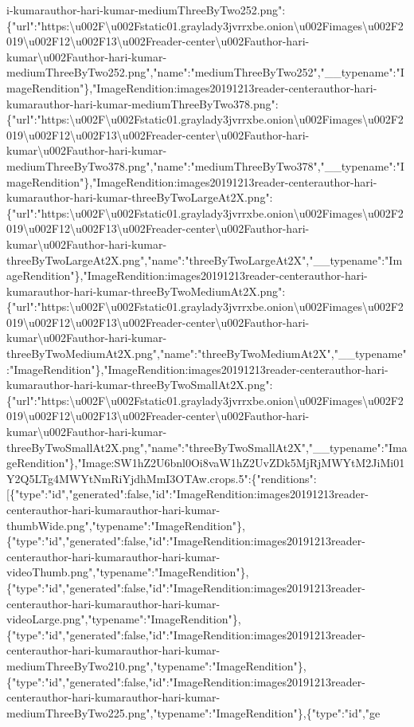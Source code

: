 i-kumarauthor-hari-kumar-mediumThreeByTwo252.png":\{"url":"https:\textbackslash{}u002F\textbackslash{}u002Fstatic01.graylady3jvrrxbe.onion\textbackslash{}u002Fimages\textbackslash{}u002F2019\textbackslash{}u002F12\textbackslash{}u002F13\textbackslash{}u002Freader-center\textbackslash{}u002Fauthor-hari-kumar\textbackslash{}u002Fauthor-hari-kumar-mediumThreeByTwo252.png","name":"mediumThreeByTwo252","\_\_typename":"ImageRendition"\},"ImageRendition:images20191213reader-centerauthor-hari-kumarauthor-hari-kumar-mediumThreeByTwo378.png":\{"url":"https:\textbackslash{}u002F\textbackslash{}u002Fstatic01.graylady3jvrrxbe.onion\textbackslash{}u002Fimages\textbackslash{}u002F2019\textbackslash{}u002F12\textbackslash{}u002F13\textbackslash{}u002Freader-center\textbackslash{}u002Fauthor-hari-kumar\textbackslash{}u002Fauthor-hari-kumar-mediumThreeByTwo378.png","name":"mediumThreeByTwo378","\_\_typename":"ImageRendition"\},"ImageRendition:images20191213reader-centerauthor-hari-kumarauthor-hari-kumar-threeByTwoLargeAt2X.png":\{"url":"https:\textbackslash{}u002F\textbackslash{}u002Fstatic01.graylady3jvrrxbe.onion\textbackslash{}u002Fimages\textbackslash{}u002F2019\textbackslash{}u002F12\textbackslash{}u002F13\textbackslash{}u002Freader-center\textbackslash{}u002Fauthor-hari-kumar\textbackslash{}u002Fauthor-hari-kumar-threeByTwoLargeAt2X.png","name":"threeByTwoLargeAt2X","\_\_typename":"ImageRendition"\},"ImageRendition:images20191213reader-centerauthor-hari-kumarauthor-hari-kumar-threeByTwoMediumAt2X.png":\{"url":"https:\textbackslash{}u002F\textbackslash{}u002Fstatic01.graylady3jvrrxbe.onion\textbackslash{}u002Fimages\textbackslash{}u002F2019\textbackslash{}u002F12\textbackslash{}u002F13\textbackslash{}u002Freader-center\textbackslash{}u002Fauthor-hari-kumar\textbackslash{}u002Fauthor-hari-kumar-threeByTwoMediumAt2X.png","name":"threeByTwoMediumAt2X","\_\_typename":"ImageRendition"\},"ImageRendition:images20191213reader-centerauthor-hari-kumarauthor-hari-kumar-threeByTwoSmallAt2X.png":\{"url":"https:\textbackslash{}u002F\textbackslash{}u002Fstatic01.graylady3jvrrxbe.onion\textbackslash{}u002Fimages\textbackslash{}u002F2019\textbackslash{}u002F12\textbackslash{}u002F13\textbackslash{}u002Freader-center\textbackslash{}u002Fauthor-hari-kumar\textbackslash{}u002Fauthor-hari-kumar-threeByTwoSmallAt2X.png","name":"threeByTwoSmallAt2X","\_\_typename":"ImageRendition"\},"Image:SW1hZ2U6bnl0Oi8vaW1hZ2UvZDk5MjRjMWYtM2JiMi01Y2Q5LTg4MWYtNmRiYjdhMmI3OTAw.crops.5":\{"renditions":{[}\{"type":"id","generated":false,"id":"ImageRendition:images20191213reader-centerauthor-hari-kumarauthor-hari-kumar-thumbWide.png","typename":"ImageRendition"\},\{"type":"id","generated":false,"id":"ImageRendition:images20191213reader-centerauthor-hari-kumarauthor-hari-kumar-videoThumb.png","typename":"ImageRendition"\},\{"type":"id","generated":false,"id":"ImageRendition:images20191213reader-centerauthor-hari-kumarauthor-hari-kumar-videoLarge.png","typename":"ImageRendition"\},\{"type":"id","generated":false,"id":"ImageRendition:images20191213reader-centerauthor-hari-kumarauthor-hari-kumar-mediumThreeByTwo210.png","typename":"ImageRendition"\},\{"type":"id","generated":false,"id":"ImageRendition:images20191213reader-centerauthor-hari-kumarauthor-hari-kumar-mediumThreeByTwo225.png","typename":"ImageRendition"\},\{"type":"id","ge